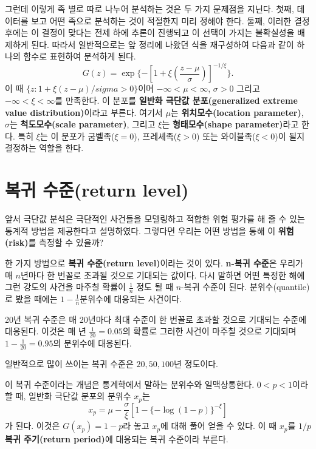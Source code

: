 \documentclass[b5paper,]{scrbook}
\theoremstyle{plain}
\theoremstyle{definition}
\numberwithin{equation}{section}
\let\BeginKnitrBlock\begin \let\EndKnitrBlock\end
\begin{document}
그런데 이렇게 족 별로 따로 나누어 분석하는 것은 두 가지 문제점을 지닌다. 첫째, 데이터를 보고 어떤 족으로 분석하는 것이 적절한지 미리 정해야 한다. 둘째, 이러한 결정 후에는 이 결정이 맞다는 전제 하에 추론이 진행되고 이 선택이 가지는 불확실성을 배제하게 된다. 따라서 일반적으로는 앞 정리에 나왔던 식을 재구성하여 다음과 같이 하나의 함수로 표현하여 분석하게 된다.
\[G(z)=\exp\{-[1+\xi(\frac{z-\mu}{\sigma})]^{-1/\xi}\}.\]
이 때 \(\{z: 1+\xi(z-\mu)/sigma >0\}\)이며 \(-\infty < \mu < \infty\), \(\sigma >0\) 그리고 \(-\infty <\xi <\infty\)를 만족한다. 이 분포를 \textbf{일반화 극단값 분포(generalized extreme value distribution)}이라고 부른다. 여기서 \(\mu\)는 \textbf{위치모수(location parameter)}, \(\sigma\)는 \textbf{척도모수(scale parameter)}, 그리고 \(\xi\)는 \textbf{형태모수(shape parameter)}라고 한다. 특히 \(\xi\)는 이 분포가 굼벨족(\(\xi=0\)), 프레셰족(\(\xi>0\)) 또는 와이블족(\(\xi<0\))이 될지 결정하는 역할을 한다.

\hypertarget{-return-level}{%
\section{복귀 수준(return level)}\label{-return-level}}

앞서 극단값 분석은 극단적인 사건들을 모델링하고 적합한 위험 평가를 해 줄 수 있는 통계적 방법을 제공한다고 설명하였다. 그렇다면 우리는 어떤 방법을 통해 이 \textbf{위험(risk)}를 측정할 수 있을까?

한 가지 방법으로 \textbf{복귀 수준(return level)}이라는 것이 있다. \textbf{n-복귀 수준}은 우리가 매 \(n\)년마다 한 번꼴로 초과될 것으로 기대되는 값이다. 다시 말하면 어떤 특정한 해에 그런 강도의 사건을 마주칠 확률이 \(\frac{1}{n}\) 정도 될 때 \(n\)-복귀 수준이 된다. 분위수(quantile)로 봤을 때에는 \(1-\frac{1}{n}\)분위수에 대응되는 사건이다.

\BeginKnitrBlock{example}[복귀 수준]
\protect\hypertarget{exm:unnamed-chunk-436}{}{\label{exm:unnamed-chunk-436} {} }20년 복귀 수준은 매 20년마다 최대 수준이 한 번꼴로 초과할 것으로 기대되는 수준에 대응된다. 이것은 매 년 \(\frac{1}{20}=0.05\)의 확률로 그러한 사건이 마주칠 것으로 기대되며 \(1-\frac{1}{20}=0.95\)의 분위수에 대응된다.
\EndKnitrBlock{example}

일반적으로 많이 쓰이는 복귀 수준은 \(20, 50, 100\)년 정도이다.

이 복귀 수준이라는 개념은 통계학에서 말하는 분위수와 일맥상통한다. \(0<p<1\)이라 할 때, 일반화 극단값 분포의 분위수 \(x_{p}\)는
\[x_{p}=\mu-\frac{\sigma}{\xi}[1-\{-\log(1-p)\}^{-\xi}]\]
가 된다. 이것은 \(G(x_{p})=1-p\)라 놓고 \(x_{p}\)에 대해 풀어 얻을 수 있다. 이 때 \(x_{p}\)를 \(1/p\) \textbf{복귀 주기(return period)}에 대응되는 복귀 수준이라 부른다.
\end{document}
